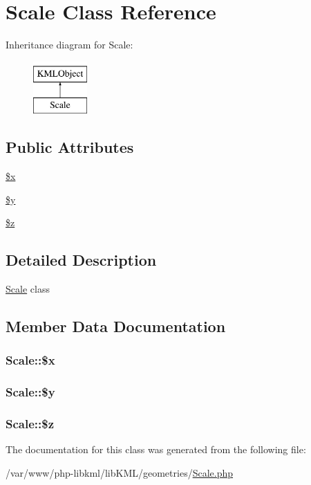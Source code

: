 \hypertarget{classScale}{
\section{Scale Class Reference}
\label{dd/d9a/classScale}
}
Inheritance diagram for Scale:\begin{figure}[H]
\begin{center}
\leavevmode
\includegraphics[height=2.000000cm]{dd/d9a/classScale}
\end{center}
\end{figure}
\subsection*{Public Attributes}
\begin{DoxyCompactItemize}
\item 
\hyperlink{classScale_a8db36a80079757cd3a7fc8ec3fd161a4}{\$x}
\item 
\hyperlink{classScale_a0e64d29d1ca6f5681920dcd0e5e83664}{\$y}
\item 
\hyperlink{classScale_affe9efa757ad49b5e331f42bf748d4ff}{\$z}
\end{DoxyCompactItemize}


\subsection{Detailed Description}
\hyperlink{classScale}{Scale} class 

\subsection{Member Data Documentation}
\hypertarget{classScale_a8db36a80079757cd3a7fc8ec3fd161a4}{
\subsubsection[{\$x}]{\setlength{\rightskip}{0pt plus 5cm}Scale::\$x}}
\label{dd/d9a/classScale_a8db36a80079757cd3a7fc8ec3fd161a4}
\hypertarget{classScale_a0e64d29d1ca6f5681920dcd0e5e83664}{
\subsubsection[{\$y}]{\setlength{\rightskip}{0pt plus 5cm}Scale::\$y}}
\label{dd/d9a/classScale_a0e64d29d1ca6f5681920dcd0e5e83664}
\hypertarget{classScale_affe9efa757ad49b5e331f42bf748d4ff}{
\subsubsection[{\$z}]{\setlength{\rightskip}{0pt plus 5cm}Scale::\$z}}
\label{dd/d9a/classScale_affe9efa757ad49b5e331f42bf748d4ff}


The documentation for this class was generated from the following file:\begin{DoxyCompactItemize}
\item 
/var/www/php-\/libkml/libKML/geometries/\hyperlink{Scale_8php}{Scale.php}\end{DoxyCompactItemize}
